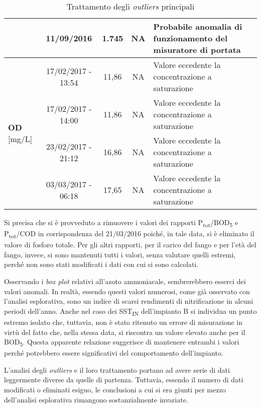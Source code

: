 \begin{sidewaystable}
\begin{center}
\begin{tabular}{|l|c|c|c|l|}
		& 11/09/2016    & 1.745                   & NA                    & Probabile anomalia di funzionamento del misuratore di portata \\ \hline
			\multirow{4}{*}{\textbf{OD} {[}mg/L{]}}  & 17/02/2017 - 13:54    & 11,86                   & NA                    & Valore eccedente la concentrazione a saturazione \\ \cline{2-5} 
		& 17/02/2017 - 14:00   & 11,86                   & NA                    & Valore eccedente la concentrazione a saturazione \\ \cline{2-5} 
		& 23/02/2017 - 21:12   & 16,86                   & NA                    & Valore eccedente la concentrazione a saturazione \\ \cline{2-5} 
		& 03/03/2017 - 06:18    & 17,65                   & NA                    & Valore eccedente la concentrazione a saturazione \\ \hline
	\end{tabular}
	\caption{Trattamento degli \textit{outliers} principali}
	\label{tab:tratt_outliers}
\end{center}
\end{sidewaystable}


Si precisa che si è provveduto a rimuovere i valori dei rapporti P\textsubscript{tot}/BOD\textsubscript{5} e P\textsubscript{tot}/COD in corrispondenza del 21/03/2016 poiché, in tale data, si è eliminato il valore di fosforo totale. Per gli altri rapporti, per il carico del fango e per l'età del fango, invece, si sono mantenuti tutti i valori, senza valutare quelli estremi, perché non sono stati modificati i dati con cui si sono calcolati.

Osservando i \textit{box plot} relativi all'azoto ammoniacale, sembrerebbero esserci dei valori anomali. In realtà, essendo questi valori numerosi, come già osservato con l'analisi esplorativa, sono un indice di scarsi rendimenti di nitrificazione in alcuni periodi dell'anno. Anche nel caso dei SST\textsubscript{IN} dell'impianto B si individua un punto estremo isolato che, tuttavia, non è stato ritenuto un errore di misurazione in virtù del fatto che, nella stessa data, si riscontra un valore elevato anche per il BOD\textsubscript{5}. Questa apparente relazione suggerisce di mantenere entrambi i valori perché potrebbero essere significativi del comportamento dell'impianto.



L'analisi degli \textit{outliers} e il loro trattamento portano ad avere serie di dati leggermente diverse da quelle di partenza. Tuttavia, essendo il numero di dati modificati o eliminati esiguo, le conclusioni a cui si era giunti per mezzo dell'analisi esplorativa rimangono sostanzialmente invariate.

